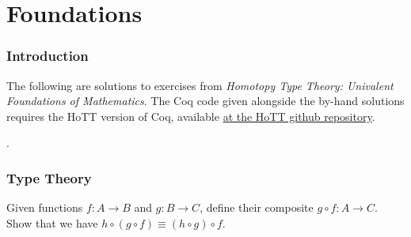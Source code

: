 \begin{coqdoccode}
\end{coqdoccode}


\part{Foundations}
\section*{Introduction}


The following are solutions to exercises from
\textit{Homotopy Type Theory: Univalent Foundations of Mathematics}.  The Coq
code given alongside the by-hand solutions requires the HoTT version of Coq,
available \href{https://github.com/HoTT}{at the HoTT github repository}.  
\begin{coqdoccode}
\coqdocemptyline
\coqdocnoindent
{}  .\coqdoceol
\coqdocemptyline
\end{coqdoccode}
\tableofcontents


\section{Type Theory}



Given functions $f:A\to B$ and $g:B\to C$, define their composite $g
\circ f : A \to C$.  Show that we have $h \circ (g \circ f) \equiv (h
    \circ g) \circ f$.


